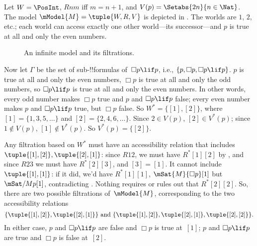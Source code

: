 \documentclass[../../../include/open-logic-section]{subfiles}
\begin{document}
\begin{ex}
  Let $W = \PosInt$, $Rnm$ iff $m = n + 1$, and $V(p) = \Setabs{2n}{n \in
    \Nat}$. The model $\mModel{M} = \tuple{W, R, V}$ is depicted in
  . The worlds are $1$, $2$, etc.; each
  world can access exactly one other world---its successor---and $p$ is
  true at all and only the even numbers.

  \begin{figure}
    \centering
	
    \caption{An infinite model and its filtrations.}
  \end{figure}
  
  Now let $\Gamma$ be the set of sub-!!{formula}s of~$\Box p \lif p$,
  i.e., $\{p, \Box p, \Box p \lif p\}$. $p$ is true at all and only
  the even numbers, $\Box p$ is true at all and only the odd numbers,
  so $\Box p \lif p$ is true at all and only the even numbers. In
  other words, every odd number makes $\Box p$ true and $p$ and $\Box
  p \lif p$ false; every even number makes $p$ and $\Box p \lif p$
  true, but $\Box p$ false. So $W^* = \{ [1], [2] \}$, where $[1] =
  \{1, 3, 5, \dots\}$ and $[2] = \{2, 4, 6, \dots\}$. Since $2 \in
  V(p)$, $[2] \in V^*(p)$; since $1 \notin V(p)$, $[1] \notin
  V^*(p)$. So $V^*(p) = \{[2]\}$.

  Any filtration based on $W^*$ must have an accessibility relation
  that includes $\tuple{[1], [2]}, \tuple{[2],[1]}$: since $R12$, we
  must have $R^*[1][2]$ by
  , and
  since $R23$ we must have $R^*[2][3]$, and $[3]=[1]$. It cannot
  include $\tuple{[1],[1]}$: if it did, we'd have $R^*[1][1]$,
  $\mSat{M}{\Box p}[1]$ but $\mSat/{M}{p}[1]$, contradicting
  . Nothing requires or rules out that
  $R^*[2][2]$. So, there are two possible filtrations of~$\mModel{M}$,
  corresponding to the two accessibility relations
  \[
  \{\tuple{[1],[2]}, \tuple{[2],[1]}\} \text{ and }
  \{\tuple{[1],[2]}, \tuple{[2],[1]}, \tuple{[2],[2]}\}.
  \]
  In either case, $p$ and $\Box p \lif p$ are false and $\Box p$ is
  true at~$[1]$; $p$ and $\Box p \lif p$ are true and $\Box p$ is
  false at~$[2]$.
\end{ex}
\end{document}
